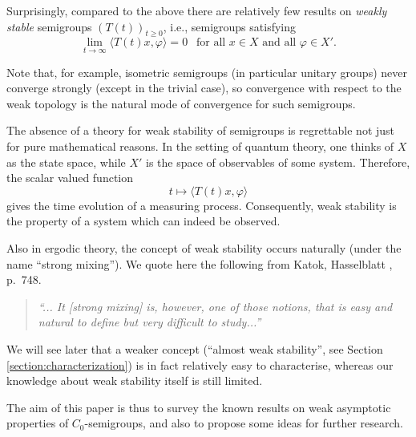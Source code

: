 \documentclass[11pt,intlimits, draft,oneside]{amsart}
\theoremstyle{definition}
\begin{document}
Surprisingly, compared to the above there are relatively few results
on \emph{weakly stable} semigroups $(T(t))_{t\geq 0}$, i.e.,
semigroups satisfying
\begin{equation*}
\lim_{t\to\infty} \langle T(t)x,\varphi \rangle = 0 \ \ \text{ for
all } x\in X \text{ and all } \varphi \in X'.
\end{equation*}
%

Note that, for example, isometric semigroups (in particular unitary groups)
never converge strongly (except in the trivial case), so convergence
with respect to the weak topology is the natural mode of convergence
for such semigroups.


The absence of a theory for weak stability of semigroups   
is regrettable not just for pure mathematical reasons. In the
setting of quantum theory, one thinks of $X$ as the state space,
while $X'$ is the space of observables of some system. Therefore,
the scalar valued function
\begin{equation*}
t\mapsto  \langle T(t)x,\varphi \rangle
\end{equation*}
gives the time evolution of a measuring process. Consequently, weak
stability is the property of a system which can indeed be observed.

Also in ergodic theory, the concept of weak stability occurs
naturally (under the name ``strong mixing''). We quote here the
following from Katok, Hasselblatt \cite{katok/hasselblatt:1995},
p.~748.

\begin{quote}\it
``... It [strong mixing] is, however, one of those notions, that is
easy and natural to define but very difficult to study...''
\end{quote}
We will see later that a weaker concept (``almost weak stability'', see 
Section \ref{section:characterization})
is in fact relatively
easy to characterise, whereas our knowledge about weak stability
itself is still limited.



\smallskip

 The aim of this paper is thus to survey the known
results on weak asymptotic properties of $C_0$-semigroups, and also
to propose some ideas for further research.
\end{document}
